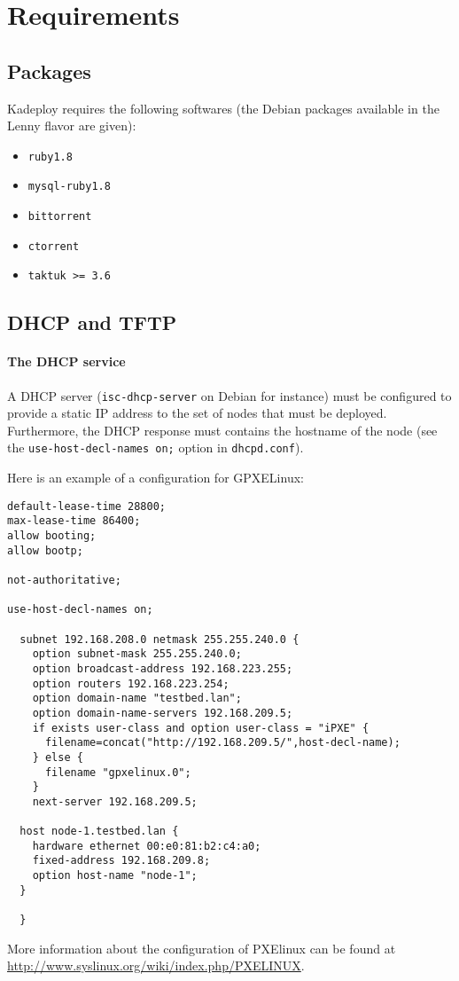 \documentclass[a4wide,10pt,oneside]{book}
\begin{document}
\section{Requirements}
\subsection{Packages}\label{sec:required-packages}
Kadeploy requires the following softwares (the Debian packages available in the Lenny flavor are given):
\begin{itemize}
\item \texttt{ruby1.8}
\item \texttt{mysql-ruby1.8}
\item \texttt{bittorrent}
\item \texttt{ctorrent}
\item \texttt{taktuk >= 3.6}
\end{itemize}

\subsection{DHCP and TFTP}
\paragraph{The DHCP service\\}
A DHCP server (\texttt{isc-dhcp-server} on Debian for instance) must be configured to provide a static IP address to the set of nodes that must be deployed. Furthermore, the DHCP response must contains the hostname of the node (see the \texttt{use-host-decl-names on;} option in \texttt{dhcpd.conf}).

Here is an example of a configuration for GPXELinux:
\begin{verbatim}
default-lease-time 28800;
max-lease-time 86400;
allow booting;
allow bootp;

not-authoritative;

use-host-decl-names on;

  subnet 192.168.208.0 netmask 255.255.240.0 {
    option subnet-mask 255.255.240.0;
    option broadcast-address 192.168.223.255;
    option routers 192.168.223.254;
    option domain-name "testbed.lan";
    option domain-name-servers 192.168.209.5;
    if exists user-class and option user-class = "iPXE" {
      filename=concat("http://192.168.209.5/",host-decl-name);
    } else {
      filename "gpxelinux.0";
    }
    next-server 192.168.209.5;

  host node-1.testbed.lan {
    hardware ethernet 00:e0:81:b2:c4:a0;
    fixed-address 192.168.209.8;
    option host-name "node-1";
  }

  }
\end{verbatim}
More information about the configuration of PXElinux can be found at \url{http://www.syslinux.org/wiki/index.php/PXELINUX}.
\end{document}
